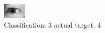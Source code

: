 \begin{figure}[h!]
\begin{center}
\includegraphics[width=0.60\columnwidth]{figures/ID3222_class_3_target_4.png}
\end{center}
\caption{ Classification: 3 actual target: 4}
\label{fig:ID3222_class_3_target_4}
\end{figure}
